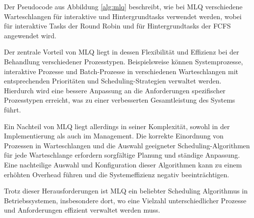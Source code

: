Der Pseudocode aus Abbildung \ref{alg:mlq} beschreibt, wie bei \ac{MLQ} verschiedene Warteschlangen für interaktive und Hintergrundtasks verwendet werden, wobei für interaktive Tasks der Round Robin und für Hintergrundtasks der \ac{FCFS} angewendet wird.

Der zentrale Vorteil von \ac{MLQ} liegt in dessen Flexibilität und Effizienz bei der Behandlung verschiedener Prozesstypen. Beispielsweise können Systemprozesse, interaktive Prozesse und Batch-Prozesse in verschiedenen Warteschlangen mit entsprechenden Prioritäten und Scheduling-Strategien verwaltet werden. Hierdurch wird eine bessere Anpassung an die Anforderungen spezifischer Prozesstypen erreicht, was zu einer verbesserten Gesamtleistung des Systems führt. %

Ein Nachteil von \ac{MLQ} liegt allerdings in seiner Komplexität, sowohl in der Implementierung als auch im Management. Die korrekte Einordnung von Prozessen in Warteschlangen und die Auswahl geeigneter Scheduling-Algorithmen für jede Warteschlange erfordern sorgfältige Planung und ständige Anpassung. Eine nachteilige Auswahl und Konfiguration dieser Algorithmen kann zu einem erhöhten Overhead führen und die Systemeffizienz negativ beeinträchtigen. %

Trotz dieser Herausforderungen ist \ac{MLQ} ein beliebter Scheduling Algorithmus in Betriebssystemen, insbesondere dort, wo eine Vielzahl unterschiedlicher Prozesse und Anforderungen effizient verwaltet werden muss.


